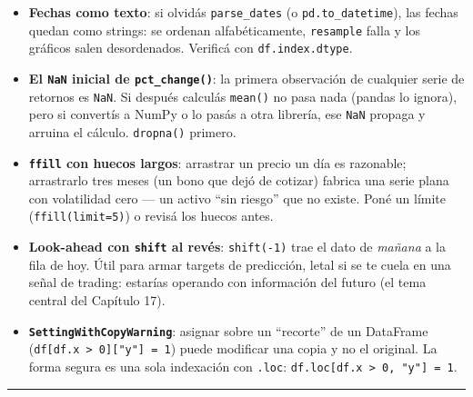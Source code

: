 \documentclass[
  spanish,
  letterpaper,
  DIV=11,
  numbers=noendperiod]{scrreprt}
\providecommand{\tightlist}{%
  \setlength{\itemsep}{0pt}\setlength{\parskip}{0pt}}
\begin{document}
\begin{tcolorbox}[enhanced jigsaw, bottomrule=.15mm, colback=white, opacitybacktitle=0.6, arc=.35mm, toprule=.15mm, opacityback=0, breakable, titlerule=0mm, left=2mm, coltitle=black, colbacktitle=quarto-callout-warning-color!10!white, colframe=quarto-callout-warning-color-frame, leftrule=.75mm, toptitle=1mm, bottomtitle=1mm, title=\textcolor{quarto-callout-warning-color}{\faExclamationTriangle}\hspace{0.5em}{Trampas frecuentes}, rightrule=.15mm]

\begin{itemize}
\tightlist
\item
  \textbf{Fechas como texto}: si olvidás \texttt{parse\_dates} (o
  \texttt{pd.to\_datetime}), las fechas quedan como strings: se ordenan
  alfabéticamente, \texttt{resample} falla y los gráficos salen
  desordenados. Verificá con \texttt{df.index.dtype}.
\item
  \textbf{El \texttt{NaN} inicial de \texttt{pct\_change()}}: la primera
  observación de cualquier serie de retornos es \texttt{NaN}. Si después
  calculás \texttt{mean()} no pasa nada (pandas lo ignora), pero si
  convertís a NumPy o lo pasás a otra librería, ese \texttt{NaN} propaga
  y arruina el cálculo. \texttt{dropna()} primero.
\item
  \textbf{\texttt{ffill} con huecos largos}: arrastrar un precio un día
  es razonable; arrastrarlo tres meses (un bono que dejó de cotizar)
  fabrica una serie plana con volatilidad cero --- un activo ``sin
  riesgo'' que no existe. Poné un límite (\texttt{ffill(limit=5)}) o
  revisá los huecos antes.
\item
  \textbf{Look-ahead con \texttt{shift} al revés}: \texttt{shift(-1)}
  trae el dato de \emph{mañana} a la fila de hoy. Útil para armar
  targets de predicción, letal si se te cuela en una señal de trading:
  estarías operando con información del futuro (el tema central del
  Capítulo 17).
\item
  \textbf{\texttt{SettingWithCopyWarning}}: asignar sobre un ``recorte''
  de un DataFrame
  (\texttt{df{[}df.x\ \textgreater{}\ 0{]}{[}"y"{]}\ =\ 1}) puede
  modificar una copia y no el original. La forma segura es una sola
  indexación con \texttt{.loc}:
  \texttt{df.loc{[}df.x\ \textgreater{}\ 0,\ "y"{]}\ =\ 1}.
\end{itemize}

\end{tcolorbox}

\begin{center}\rule{0.5\linewidth}{0.5pt}\end{center}
\end{document}
